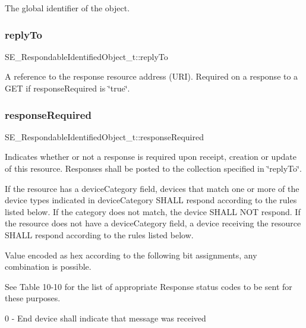 The global identifier of the object. \mbox{\label{group__RespondableIdentifiedObject_gacc38745c80ef60c65b39b81328769362}} 
\subsubsection{\texorpdfstring{reply\+To}{replyTo}}
{\footnotesize\ttfamily S\+E\+\_\+\+Respondable\+Identified\+Object\+\_\+t\+::reply\+To}

A reference to the response resource address (U\+RI). Required on a response to a G\+ET if response\+Required is \char`\"{}true\char`\"{}. \mbox{\label{group__RespondableIdentifiedObject_gac5e7e3639c4de39371139e684101f745}} 
\subsubsection{\texorpdfstring{response\+Required}{responseRequired}}
{\footnotesize\ttfamily S\+E\+\_\+\+Respondable\+Identified\+Object\+\_\+t\+::response\+Required}

Indicates whether or not a response is required upon receipt, creation or update of this resource. Responses shall be posted to the collection specified in \char`\"{}reply\+To\char`\"{}.

If the resource has a device\+Category field, devices that match one or more of the device types indicated in device\+Category S\+H\+A\+LL respond according to the rules listed below. If the category does not match, the device S\+H\+A\+LL N\+OT respond. If the resource does not have a device\+Category field, a device receiving the resource S\+H\+A\+LL respond according to the rules listed below.

Value encoded as hex according to the following bit assignments, any combination is possible.

See Table 10-\/10 for the list of appropriate Response status codes to be sent for these purposes.

0 -\/ End device shall indicate that message was received

